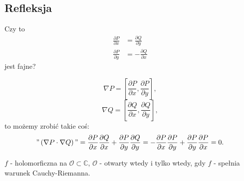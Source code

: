 \documentclass[../main.tex]{subfiles}
\begin{document}
    \subsection{Refleksja}
    Czy to
    \begin{align*}
        \frac{\partial P}{\partial x} &= \frac{\partial Q}{\partial y} \\
        \frac{\partial P}{\partial y} &= - \frac{\partial Q}{\partial x}
    \end{align*}
    jest fajne?
    \begin{przyklad}
        \[
            \nabla P = \left[ \frac{\partial P}{\partial x} , \frac{\partial P}{\partial y}  \right]
        ,\]
    \[
        \nabla Q = \left[ \frac{\partial Q}{\partial x} , \frac{\partial Q}{\partial y}  \right]
    ,\]
to możemy zrobić takie coś:
\[
    "\left( \nabla P \cdot \nabla Q \right) " = \frac{\partial P}{\partial x} \frac{\partial Q}{\partial x} + \frac{\partial P}{\partial y} \frac{\partial Q}{\partial y} = - \frac{\partial P}{\partial x} \frac{\partial P}{\partial y} + \frac{\partial P}{\partial y} \frac{\partial P}{\partial x} = 0
.\]
    \end{przyklad}
    \begin{tw}
        $f$ - holomorficzna na $\mathcal{O}\subset\mathbb{C}$, $\mathcal{O}$ - otwarty wtedy i tylko wtedy, gdy $f$ - spełnia warunek Cauchy-Riemanna.
    \end{tw}
\end{document}

